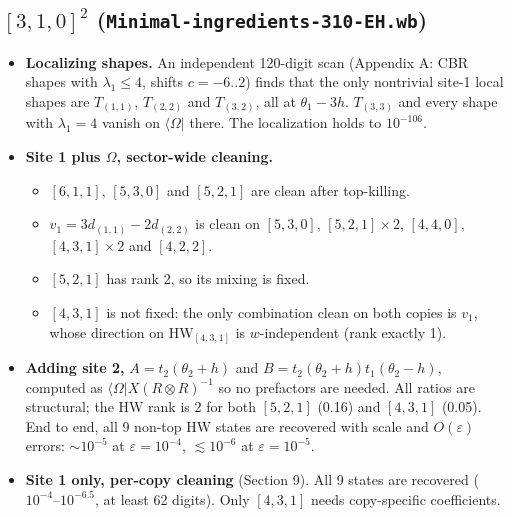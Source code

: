 \documentclass[11pt]{article}
\newcommand{\bra}[1]{\langle #1|}
\newcommand{\Om}{\Omega}
\newcommand{\HW}{\mathrm{HW}}
\newcommand{\eps}{\varepsilon}
\begin{document}
\subsection{$[3,1,0]^2$ (\texttt{Minimal-ingredients-310-EH.wb})}
\begin{itemize}
\item \textbf{Localizing shapes.} An independent 120-digit scan (Appendix A: CBR shapes with $\lambda_1\le4$, shifts $c=-6..2$) finds that the only nontrivial site-1 local shapes are $T_{(1,1)}$, $T_{(2,2)}$ and $T_{(3,2)}$, all at $\theta_1-3h$. $T_{(3,3)}$ and every shape with $\lambda_1=4$ vanish on $\bra\Om$ there. The localization holds to $10^{-106}$.
\item \textbf{Site 1 plus $\Omega$, sector-wide cleaning.}
\begin{itemize}
\item $[6,1,1]$, $[5,3,0]$ and $[5,2,1]$ are clean after top-killing.
\item $v_1=3d_{(1,1)}-2d_{(2,2)}$ is clean on $[5,3,0]$, $[5,2,1]\times2$, $[4,4,0]$, $[4,3,1]\times2$ and $[4,2,2]$.
\item $[5,2,1]$ has rank 2, so its mixing is fixed.
\item $[4,3,1]$ is not fixed: the only combination clean on both copies is $v_1$, whose direction on $\HW_{[4,3,1]}$ is $w$-independent (rank exactly 1).
\end{itemize}
\item \textbf{Adding site 2,} $A=t_2(\theta_2+h)$ and $B=t_2(\theta_2+h)t_1(\theta_2-h)$, computed as $\bra\Om X(R\otimes R)^{-1}$ so no prefactors are needed. All ratios are structural; the HW rank is 2 for both $[5,2,1]$ (0.16) and $[4,3,1]$ (0.05). End to end, all 9 non-top HW states are recovered with scale and $O(\eps)$ errors: $\sim10^{-5}$ at $\eps=10^{-4}$, $\lesssim10^{-6}$ at $\eps=10^{-5}$.
\item \textbf{Site 1 only, per-copy cleaning} (Section 9). All 9 states are recovered ($10^{-4}$--$10^{-6.5}$, at least 62 digits). Only $[4,3,1]$ needs copy-specific coefficients.
\end{itemize}
\end{document}
